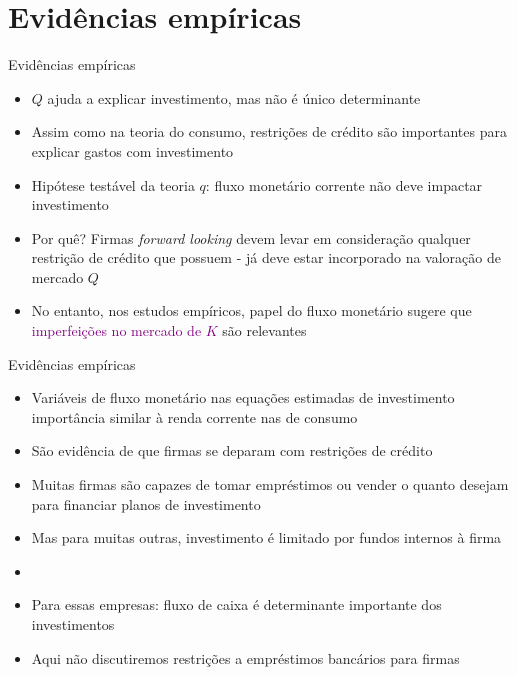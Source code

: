 \documentclass[10pt]{beamer}
\begin{document}
\section{Evidências empíricas}
\begin{frame}
    {Evidências empíricas}
    \begin{itemize}
        \item $Q$ ajuda a explicar investimento, mas não é único determinante\bigskip
        \item Assim como na teoria do consumo, restrições de crédito são importantes para explicar gastos com investimento\bigskip
        \item Hipótese testável da teoria $q$: fluxo monetário corrente não deve impactar investimento\bigskip
        \item Por quê? Firmas \emph{forward looking} devem levar em consideração qualquer restrição de crédito que possuem - já deve estar incorporado na valoração de mercado $Q$\bigskip
        \item No entanto, nos estudos empíricos, papel do fluxo monetário sugere que \textcolor{purple}{imperfeições no mercado de $K$} são relevantes
    \end{itemize}
\end{frame}

\begin{frame}
    {Evidências empíricas}
    \begin{itemize}
        \item Variáveis de fluxo monetário nas equações estimadas de investimento importância similar à renda corrente nas de consumo\bigskip
        \item São evidência de que firmas se deparam com restrições de crédito\bigskip
        \item Muitas firmas são capazes de tomar empréstimos ou vender o quanto desejam para financiar planos de investimento\bigskip
        \item Mas para muitas outras, investimento é limitado por fundos internos à firma\bigskip
        \item {}\bigskip
        \item Para essas empresas: fluxo de caixa é determinante importante dos investimentos\bigskip
        \item Aqui não discutiremos restrições a empréstimos bancários para firmas
    \end{itemize}
\end{frame}
\end{document}
